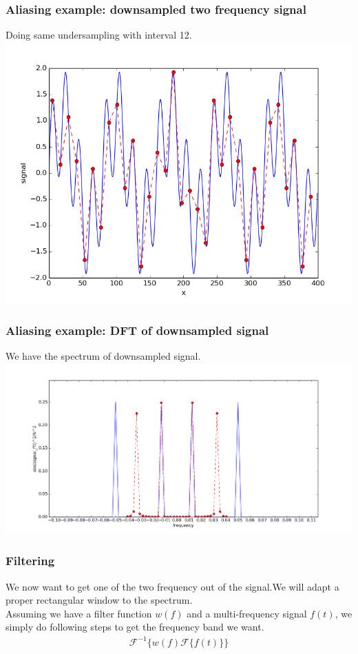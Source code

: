 \documentclass{beamer}
\begin{document}
\begin{frame}
\frametitle{Aliasing example: downsampled two frequency signal}
Doing same undersampling with interval 12. \\
\includegraphics[scale=0.4]{undersampled_two_f_signal.png}
\end{frame}
\begin{frame}
\frametitle{Aliasing example: DFT of downsampled signal}
We have the spectrum of downsampled signal. \\
\includegraphics[scale=0.3]{undersampled_two_f_dft.png}
\end{frame}
\begin{frame}
\frametitle{Filtering}
We now want to get one of the two frequency out of the signal.We will adapt a proper rectangular window to the spectrum.\\
Assuming we have a filter function $w(f)$ and a multi-frequency signal $f(t)$, we simply do following steps to get the frequency band we want.
\begin{eqnarray}
\mathcal{F}^{-1}\{w(f)\mathcal{F}\{f(t)\}\}
\label{eq:dft_filter}
\end{eqnarray}
\end{frame}
\end{document}
